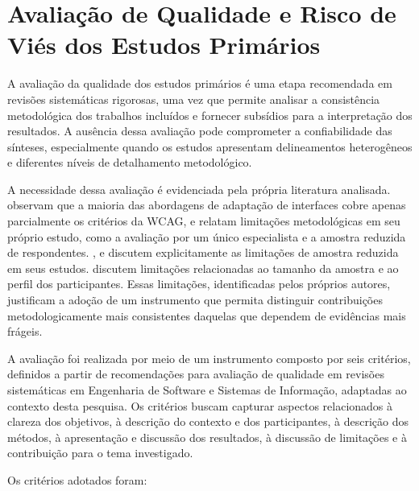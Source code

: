\section{Avaliação de Qualidade e Risco de Viés dos Estudos Primários}

\label{sec:qualidade}

A avaliação da qualidade dos estudos primários é uma etapa recomendada em revisões sistemáticas rigorosas, uma vez que permite analisar a consistência metodológica dos trabalhos incluídos e fornecer subsídios para a interpretação dos resultados. A ausência dessa avaliação pode comprometer a confiabilidade das sínteses, especialmente quando os estudos apresentam delineamentos heterogêneos e diferentes níveis de detalhamento metodológico.

A necessidade dessa avaliação é evidenciada pela própria literatura analisada. \cite{wickramathilaka2023addressing} observam que a maioria das abordagens de adaptação de interfaces cobre apenas parcialmente os critérios da WCAG, e \cite{dombrovskaia2021guideline} relatam limitações metodológicas em seu próprio estudo, como a avaliação por um único especialista e a amostra reduzida de respondentes. \cite{dombrovskaia2021guideline}, \cite{gatsou2017seniors} e \cite{xie2010usability} discutem explicitamente as limitações de amostra reduzida em seus estudos. \cite{barron2013feasibility} discutem limitações relacionadas ao tamanho da amostra e ao perfil dos participantes. Essas limitações, identificadas pelos próprios autores, justificam a adoção de um instrumento que permita distinguir contribuições metodologicamente mais consistentes daquelas que dependem de evidências mais frágeis.

A avaliação foi realizada por meio de um instrumento composto por seis critérios, definidos a partir de recomendações para avaliação de qualidade em revisões sistemáticas em Engenharia de Software e Sistemas de Informação, adaptadas ao contexto desta pesquisa. Os critérios buscam capturar aspectos relacionados à clareza dos objetivos, à descrição do contexto e dos participantes, à descrição dos métodos, à apresentação e discussão dos resultados, à discussão de limitações e à contribuição para o tema investigado.

Os critérios adotados foram:

